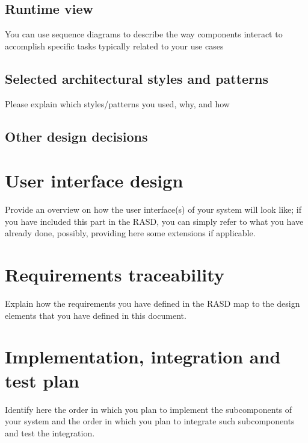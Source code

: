 \documentclass[a4paper, hidelinks, 12pt]{report}
\begin{document}
	\section{Runtime view}
	You can use sequence diagrams to describe the way components
interact to accomplish specific tasks typically related to your use cases

	\section{Selected architectural styles and patterns}
	Please explain which styles/patterns you
used, why, and how 

	\section{Other design decisions}
	
	\chapter{User interface design}
	Provide an overview on how the user interface(s) of your system will look like; if you have included this part in the RASD, you can simply refer to what you have already done, possibly, providing here some extensions if applicable.
	
	\chapter{Requirements traceability}
	Explain how the requirements you have defined in the RASD map to the design elements that you have defined in this document.
	
	\chapter{Implementation, integration and test plan}
	Identify here the order in which you plan to implement the subcomponents of your system and the order in which you plan to integrate such subcomponents and test the integration.
	
\end{document}
